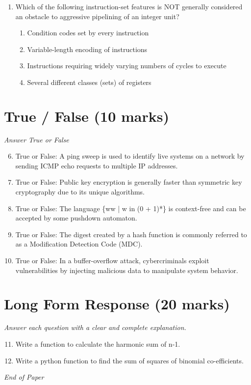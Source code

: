 \documentclass[12pt]{article}
\begin{document}
\begin{enumerate}[label=\arabic*.]
\begin{enumerate}[label=(\alph*)]
    \item n
    \item n + 1
    \item n + 2
    \item 2 n
\end{enumerate}
\item Which of the following instruction-set features is NOT generally considered an obstacle to aggressive pipelining of an integer unit?
\begin{enumerate}[label=(\alph*)]
    \item Condition codes set by every instruction
    \item Variable-length encoding of instructions
    \item Instructions requiring widely varying numbers of cycles to execute
    \item Several different classes (sets) of registers
\end{enumerate}
\end{enumerate}

\section*{True / False (10 marks)}
\textit{Answer True or False}
\begin{enumerate}[label=\arabic*.]
\setcounter{enumi}{5}
\item True or False: A ping sweep is used to identify live systems on a network by sending ICMP echo requests to multiple IP addresses.
\item True or False: Public key encryption is generally faster than symmetric key cryptography due to its unique algorithms.
\item True or False: The language \{ww | w in (0 + 1)*\} is context-free and can be accepted by some pushdown automaton.
\item True or False: The digest created by a hash function is commonly referred to as a Modification Detection Code (MDC).
\item True or False: In a buffer-overflow attack, cybercriminals exploit vulnerabilities by injecting malicious data to manipulate system behavior.
\end{enumerate}

\section*{Long Form Response (20 marks)}
\textit{Answer each question with a clear and complete explanation.}
\begin{enumerate}[label=\arabic*.]
\setcounter{enumi}{10}
\item Write a function to calculate the harmonic sum of n-1.
\item Write a python function to find the sum of squares of binomial co-efficients.
\end{enumerate}

\vfill
\noindent\textit{End of Paper}
\end{document}
